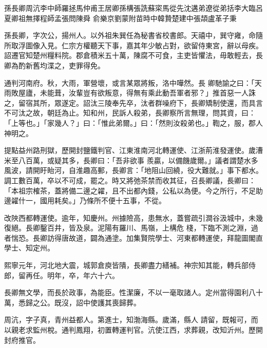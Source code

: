 
\begin{pinyinscope}

 孫長卿周沆李中師羅拯馬仲甫王居卿孫構張詵蘇寀馬從先沈遘弟遼從弟括李大臨呂夏卿祖無擇程師孟張問陳舜
 俞樂京劉蒙附苗時中韓贄楚建中張頡盧革子秉



 孫長卿，字次公，揚州人。以外祖朱巽任為秘書省校書郎。天禧中，巽守雍，命隨所取浮圖像入見。仁宗方權聽天下事，嘉其年少敏占對，欲留侍東宮，辭以母疾。詔遷官知楚州糧料院。郡倉積米五十萬，陳腐不可食，主吏皆懼法，毋敢輕去，長卿為酌新舊均渫之，吏罪得免。



 通判河南府。秋，大雨，軍營壞，或言某眾將叛，洛中嘩然。長
 卿馳諭之曰：「天雨敗屋廬，未能葺，汝輩豈有欲叛意，得無有乘此動吾軍者邪？」推首惡一人誅之，留宿其所，眾遂定。詔汰三陵奉先卒，汰者群噪府下，長卿矯制使還，而具言不可汰之故，朝廷為止。知和州，民訴人殺弟，長卿察所言無理，問其資，曰：「上等也。」「家幾人？」曰：「惟此弟爾。」曰：「然則汝殺弟也。」鞫之，服，郡人神明之。



 提點益州路刑獄，歷開封鹽鐵判官、江東淮南河北轉運使、江浙荊淮發運使。歲漕米至八百萬，或疑其多，長卿曰：「吾非欲事
 羨贏，以備饑歲爾。」議者謂楚水多風波，請開盱眙河，自淮趣高郵，長卿言：「地阻山回繞，役大難就。」事下都水。調工數百萬，卒以不可成，罷之。時又將弛茶禁而收其征，召長卿議，長卿曰：「本祖宗榷茶，蓋將備二邊之糴，且不出都內錢，公私以為便。今之所行，不足助邊糴什一，國用耗矣。」乃條所不便十五事，不從。



 改陜西都轉運使。逾年，知慶州。州據險高，患無水，蓋嘗疏引澗谷汲城中，未幾復絕。長卿鑿百井，皆及泉。泥陽有羅川、馬嶺，上構危
 棧，下臨不測之淵，過者惴恐。長卿訪得唐故道，闢為通塗。加集賢院學士、河東都轉運使，拜龍圖閣直學士、知定州。



 熙寧元年，河北地大震，城郭倉庾皆隤，長卿盡力繕補。神宗知其能，轉兵部侍郎，留再任。明年，卒，年六十六。



 長卿無文學，而長於政事，為能臣。性潔廉，不以一毫取諸人。定州當得園利八十萬，悉歸之公。既沒，詔中使護其喪歸葬。



 周沆，字子真，青州益都人。第進士，知渤海縣。歲滿，縣人
 請留，既報可，而以親老求監州稅。通判鳳翔，初置轉運判官。沆使江西，求葬親，改知沂州。歷開封府推官。




\end{pinyinscope}

